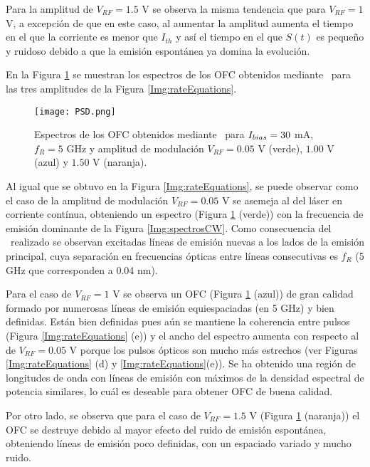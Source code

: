 		Para la amplitud de $V_{RF} = 1.5$ V se observa la misma tendencia que para $V_{RF} = 1$ V, a excepci\'on de que en este caso, al aumentar la amplitud aumenta el tiempo en el que la corriente es menor que $I_{th}$ y as\'i el tiempo en el que $S(t)$ es pequeño y ruidoso debido a que la emisi\'on espontánea ya domina la evolución.


		En la Figura \ref{Img:PSD} se muestran los espectros de los OFC obtenidos mediante \gs\ para las tres amplitudes de la Figura \ref{Img:rateEquations}.

			\begin{figure}[H]
				\centering
				\texttt{[image: PSD.png]}
				\caption{\label{Img:PSD}Espectros de los OFC obtenidos mediante \gs\ para $I_{bias} = 30$ mA, $f_R = 5$ GHz y amplitud de modulaci\'on $V_{RF} = 0.05$ V (verde), $1.00$ V (azul) y $1.50$ V (naranja).}
			\end{figure}
			
		Al igual que se obtuvo en la Figura \ref{Img:rateEquations}, se puede observar como el caso de la amplitud de modulaci\'on $V_{RF} = 0.05$ V se asemeja al del l\'aser en corriente cont\'inua, obteniendo un espectro (Figura \ref{Img:PSD} (verde)) con la frecuencia de emisi\'on dominante de la Figura \ref{Img:spectrosCW}. Como consecuencia del \gs\ realizado se observan excitadas líneas de emisión nuevas a los lados de la emisi\'on principal, cuya separación en frecuencias ópticas entre líneas consecutivas es $f_R$ (5 GHz que corresponden a 0.04 nm).

		Para el caso de $V_{RF} = 1$ V se observa un OFC (Figura \ref{Img:PSD} (azul)) de gran calidad formado por numerosas l\'ineas de emisión equiespaciadas (en 5 GHz) y bien definidas. Están bien definidas pues aún se mantiene la coherencia entre pulsos (Figura \ref{Img:rateEquations} (e)) y el ancho del espectro aumenta con respecto al de $V_{RF} = 0.05$ V porque los pulsos ópticos son mucho más estrechos (ver Figuras \ref{Img:rateEquations} (d) y \ref{Img:rateEquations}(e)). Se ha obtenido una regi\'on de longitudes de onda con l\'ineas de emisión con máximos de la densidad espectral de potencia similares, lo cuál es deseable para obtener OFC de buena calidad.

		Por otro lado, se observa que para el caso de $V_{RF} = 1.5$ V (Figura \ref{Img:PSD} (naranja)) el OFC se destruye debido al mayor efecto del ruido de emisión espont\'anea, obteniendo l\'ineas de emisión poco definidas, con un espaciado variado y mucho ruido.

